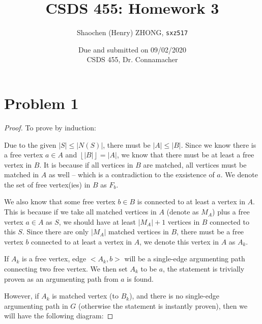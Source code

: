 \documentclass[11pt]{article}
\newcommand{\ilc}{\texttt}
\providecommand{\myfloor}[1]{\left \lfloor #1 \right \rfloor }
\begin{document}
\title{\textbf{CSDS 455: Homework 3}}

\author{Shaochen (Henry) ZHONG, \ilc{sxz517}}
\date{Due and submitted on 09/02/2020 \\ CSDS 455, Dr. Connamacher}
\maketitle

\section{Problem 1}


\begin{proof}
To prove by induction:\newline

Due to the given $|S| \leq |N(S)|$, there must be $|A| \leq |B|$. Since we know there is a free vertex $a \in A$ and $\myfloor{|B|} = |A|$, we know that there must be at least a free vertex in $B$. It is because if all vertices in $B$ are matched, all vertices must be matched in $A$ as well -- which is a contradiction to the exsistence of $a$. We denote the set of free vertex(ies) in $B$ as $F_b$.

We also know that some free vertex $b \in B$ is connected to at least a vertex in $A$. This is because if we take all matched vertices in $A$ (denote as $M_A$) plus a free vertex $a \in A$ as $S$, we should have at least $|M_A| + 1$ vertices in $B$ connected to this $S$. Since there are only $|M_A|$ matched vertices in $B$, there must be a free vertex $b$ connected to at least a vertex in $A$, we denote this vertex in $A$ as $A_k$.\newline


If $A_k$ is a free vertex, edge $<A_k, b>$ will be a single-edge argumenting path connecting two free vertex. We then set $A_k$ to be $a$, the statement is trivially proven as an argumenting path from $a$ is found.

However, if $A_k$ is matched vertex (to $B_k$), and there is no single-edge argumenting path in $G$ (otherwise the statement is instantly proven), then we will have the following diagram:


\end{proof}
\end{document}
